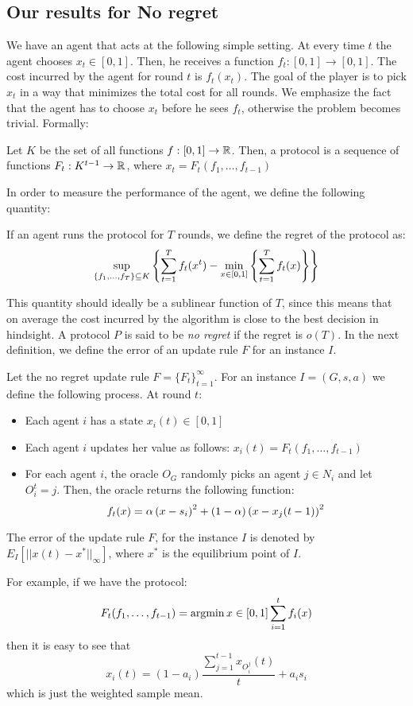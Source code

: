 \subsection{Our results for No regret}
We have an agent that acts at the following simple setting. At every time $t$ the agent chooses $x_t \in [0,1]$. 
Then, he receives a function $f_t:[0,1]\to [0,1]$. The cost incurred by 
the agent for round $t$ is $f_t(x_t)$. 
The goal of the player is to pick $x_t$ in a way that minimizes the total cost for all rounds.
We emphasize the fact that the agent has to choose $x_t$ before he sees $f_t$, otherwise the problem becomes trivial. 
Formally:
\begin{definition}
Let $K$ be the set of all functions $f:[0,1]\to \mathbb{R}$. Then, a protocol is a sequence of functions $F_t:K^{t-1} \to \mathbb{R}$, where $x_t = F_t(f_1, \ldots,f_{t-1})$
\end{definition} 
In order to measure the performance of the agent, we define the following quantity:
\begin{definition}
If an agent runs the protocol for $T$ rounds, we define the regret of the protocol as:
\[
\sup_{\{f_1,\ldots ,f_T\}\subseteq K}\left\{\sum_{t=1}^T f_t(x^t) - \min_{x\in[0,1]}\left\{\sum_{t=1}^T f_t(x)\right\}\right\}
\]
\end{definition}
This quantity should ideally be a sublinear function of $T$, since this means that on average the cost incurred by the algorithm is close to 
the best decision in hindsight.
A protocol $P$ is said to be \emph{no regret} if the regret is $o(T)$.
In the next definition, we define the error of an update rule $F$ for an instance $I$.  
\begin{definition}\label{No regret Update Rules}
Let the no regret update rule $F = \{F_t\}_{t=1}^{\infty}$. For an instance $I=(G,s,a)$ we define the following process. At round $t$:
\begin{itemize}
 \item Each agent $i$ has a state $x_i(t) \in [0,1]$
 \item Each agent $i$ updates her value as follows: $x_i(t) = F_t(f_1,\ldots,f_{t-1})$
 \item For each agent $i$, the oracle $O_G$ randomly picks an agent $j \in N_i$ and let $O_i^t = j$. Then, the oracle returns the following function:
\[
f_t(x) = \alpha\left(x - s_i\right)^2 + (1 - \alpha)\left(x - x_j(t-1)\right)^2
\]

\end{itemize}
The error of the update rule $F$, for the instance $I$ is denoted by $E_I[||x(t)-x^*||_\infty]$, where $x^*$ is the equilibrium point of $I$.
\end{definition}
For example, if we have the protocol: 
\[
F_t(f_1, \ldots,f_{t-1}) = \operatorname*{argmin}{x\in[0,1]}\sum_{i=1}^t f_i(x)
\]
then it is easy to see that 
\[
x_i(t) = (1-a_i)\frac{\sum_{j=1}^{t-1}x_{O_i^j}(t)}{t} + a_is_i
\]
which is just the weighted sample mean. 

